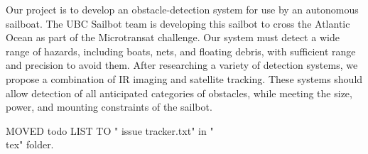 Our project is to develop an obstacle-detection system for use by an autonomous sailboat.  The UBC Sailbot team is developing this sailbot to cross the Atlantic Ocean as part of the Microtransat challenge.  Our system must detect a wide range of hazards, including boats, nets, and floating debris, with sufficient range and precision to avoid them.  After researching a variety of detection systems, we propose a combination of IR imaging and satellite tracking.  These systems should allow detection of all anticipated categories of obstacles, while meeting the size, power, and mounting constraints of the sailbot.

MOVED todo LIST TO "  issue tracker.txt" in "\\tex" folder.
